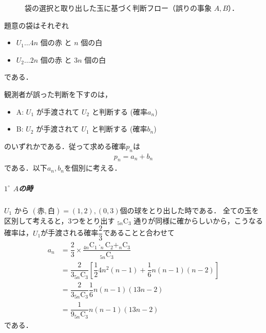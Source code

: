 \documentclass[../../main.tex]{subfiles}
\begin{document}
\begin{figure}[htb]
  \caption{袋の選択と取り出した玉に基づく判断フロー（誤りの事象 $A, B$）．}
  \label{fig:urn_decision_tree}
\end{figure}

題意の袋はそれぞれ
\begin{itemize}
  \item $U_1 \dots 4n$ 個の赤 と $n$ 個の白 \\
  \item $U_2 \dots 2n$ 個の赤 と $3n$ 個の白
\end{itemize}
である．

観測者が誤った判断を下すのは，
\begin{itemize}
  \item A: $U_1$ が手渡されて $U_2$ と判断する (確率$a_n$) \\
  \item B: $U_2$ が手渡されて $U_1$ と判断する (確率$b_n$)
\end{itemize}
のいずれかである．従って求める確率$p_n$は
\begin{align}
  p_n = a_n + b_n \label{eq:1}
\end{align}
である．以下$a_n,b_n$を個別に考える．

\subparagraph{$1^{\circ}$ $A$の時}

$U_1$ から $(\text{赤}, \text{白}) = (1, 2), (0, 3)$個の球をとり出した時である．
全ての玉を区別して考えると，3つをとり出す ${}_{5n}\mathrm{C}_3$ 通りが同様に確からしいから，こうなる確率は，$U_1$が手渡される確率$\dfrac{2}{3}$であることと合わせて
\begin{align}
  a_n
  & =  \dfrac{2}{3} \times \dfrac{_{4n}\mathrm{C}_1 \cdot _n\mathrm{C}_2 + _n\mathrm{C}_3}{{}_{5n}\mathrm{C}_3} \\
  & = \dfrac{2}{3 {}_{5n}\mathrm{C}_3}\left[\dfrac{1}{2}4n^2(n-1)+\dfrac{1}{6}n(n-1)(n-2)\right] \\
  & = \dfrac{2}{3 {}_{5n}\mathrm{C}_3}\dfrac{1}{6}n(n-1)(13n-2) \\
  & = \dfrac{1}{9 {}_{5n}\mathrm{C}_3}n(n-1)(13n-2) \label{eq:2}
\end{align}
である．
\end{document}
